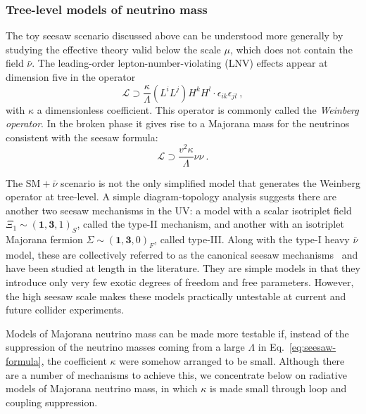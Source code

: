 \subsubsection{Tree-level models of neutrino mass}

The toy seesaw scenario discussed above can be understood more generally by
studying the effective theory valid below the scale $\mu$, which does not
contain the field $\bar{\nu}$. The leading-order lepton-number-violating (LNV)
effects appear at dimension five in the operator
\begin{equation}
  \mathscr{L} \supset \frac{\kappa}{\Lambda} (L^{i}L^{j})H^{k}H^{l} \cdot \epsilon_{ik}\epsilon_{jl} \ ,
\end{equation}
with $\kappa$ a dimensionless coefficient. This operator is commonly called the
\textit{Weinberg operator}. In the broken phase it gives rise to a Majorana mass
for the neutrinos consistent with the seesaw formula:
\begin{equation}
  \label{eq:seesaw-formula}
  \mathscr{L} \supset \frac{v^{2} \kappa}{\Lambda} \nu \nu \ .
\end{equation}

The $\text{SM}+\bar{\nu}$ scenario is not the only simplified model that
generates the Weinberg operator at tree-level. A simple diagram-topology
analysis suggests there are another two seesaw mechanisms in the UV: a model
with a scalar isotriplet field $\Xi_{1} \sim (\mathbf{1}, \mathbf{3}, 1)_{S}$,
called the type-II mechanism, and another with an isotriplet Majorana fermion
$\Sigma \sim (\mathbf{1}, \mathbf{3}, 0)_{F}$, called type-III. Along with the
type-I heavy $\bar{\nu}$ model, these are collectively referred to as the
canonical seesaw mechanisms~\cite{MINKOWSKI1977421, Yanagida:1979as,
  GellMann:1980vs, PhysRevLett.44.912, Glashow:1979nm, Magg:1980ut,
  PhysRevD.22.2227, LAZARIDES1981287, Wetterich:1981bx, PhysRevD.23.165,
  Foot:1988aq} and have been studied at length in the literature. They are
simple models in that they introduce only very few exotic degrees of freedom and
free parameters. However, the high seesaw scale makes these models practically
untestable at current and future collider experiments.

Models of Majorana neutrino mass can be made more testable if, instead of the
suppression of the neutrino masses coming from a large $\Lambda$ in
Eq.~\eqref{eq:seesaw-formula}, the coefficient $\kappa$ were somehow arranged to
be small. Although there are a number of mechanisms to achieve this, we
concentrate below on radiative models of Majorana neutrino mass, in which
$\kappa$ is made small through loop and coupling suppression.


